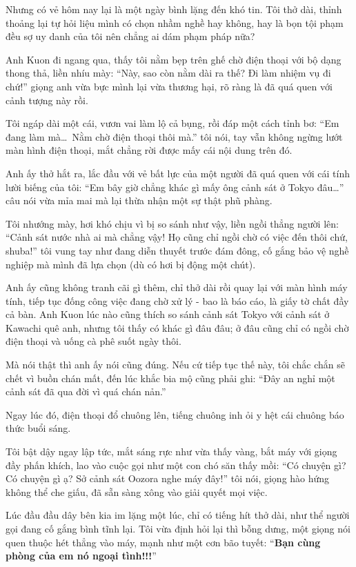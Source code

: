 \documentclass[../main.tex]{subfiles}
\begin{document}
Nhưng có vẻ hôm nay lại là một ngày bình lặng đến khó tin. Tôi thở dài, thỉnh thoảng lại tự hỏi liệu mình có chọn nhầm nghề hay không, hay là bọn tội phạm đều sợ uy danh của tôi nên chẳng ai dám phạm pháp nữa?


Anh Kuon đi ngang qua, thấy tôi nằm bẹp trên ghế chờ điện thoại với bộ dạng thong thả, liền nhíu mày: ``Này, sao còn nằm dài ra thế? Đi làm nhiệm vụ đi chứ!'' giọng anh vừa bực mình lại vừa thương hại, rõ ràng là đã quá quen với cảnh tượng này rồi.

Tôi ngáp dài một cái, vươn vai làm lộ cả bụng, rồi đáp một cách tỉnh bơ: ``Em đang làm mà\dots\ Nằm chờ điện thoại thôi mà.'' tôi nói, tay vẫn không ngừng lướt màn hình điện thoại, mắt chẳng rời được mấy cái nội dung trên đó.

Anh ấy thở hắt ra, lắc đầu với vẻ bất lực của một người đã quá quen với cái tính lười biếng của tôi: ``Em bây giờ chẳng khác gì mấy ông cảnh sát ở Tokyo đâu\dots'' câu nói vừa mỉa mai mà lại thừa nhận một sự thật phũ phàng.

Tôi nhướng mày, hơi khó chịu vì bị so sánh như vậy, liền ngồi thẳng người lên: ``Cảnh sát nước nhà ai mà chẳng vậy! Họ cũng chỉ ngồi chờ có việc đến thôi chứ, shuba!'' tôi vung tay như đang diễn thuyết trước đám đông, cố gắng bảo vệ nghề nghiệp mà mình đã lựa chọn (dù có hơi bị động một chút).

Anh ấy cũng không tranh cãi gì thêm, chỉ thở dài rồi quay lại với màn hình máy tính, tiếp tục đống công việc đang chờ xử lý - bao là báo cáo, là giấy tờ chất đầy cả bàn. Anh Kuon lúc nào cũng thích so sánh cảnh sát Tokyo với cảnh sát ở Kawachi quê anh, nhưng tôi thấy có khác gì đâu đâu; ở đâu cũng chỉ có ngồi chờ điện thoại và uống cà phê suốt ngày thôi.

Mà nói thật thì anh ấy nói cũng đúng. Nếu cứ tiếp tục thế này, tôi chắc chắn sẽ chết vì buồn chán mất, đến lúc khắc bia mộ cũng phải ghi: ``Đây an nghỉ một cảnh sát đã qua đời vì quá chán nản.''

Ngay lúc đó, điện thoại đổ chuông lên, tiếng chuông inh ỏi y hệt cái chuông báo thức buổi sáng.

Tôi bật dậy ngay lập tức, mắt sáng rực như vừa thấy vàng, bắt máy với giọng đầy phấn khích, lao vào cuộc gọi như một con chó săn thấy mồi: ``Có chuyện gì? Có chuyện gì ạ? Sở cảnh sát Oozora nghe máy đây!'' tôi nói, giọng hào hứng không thể che giấu, đã sẵn sàng xông vào giải quyết mọi việc.

Lúc đầu đầu dây bên kia im lặng một lúc, chỉ có tiếng hít thở dài, như thể người gọi đang cố gắng bình tĩnh lại. Tôi vừa định hỏi lại thì bỗng dưng, một giọng nói quen thuộc hét thẳng vào máy, mạnh như một cơn bão tuyết: ``\textbf{Bạn cùng phòng của em nó ngoại tình!!!}''
\end{document}
